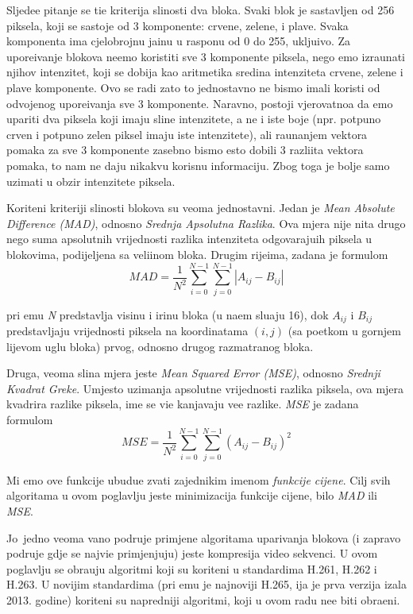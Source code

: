 Sljede\cj e pitanje se ti\ch e kriterija sli\ch nosti dva bloka. Svaki blok je sastavljen od 256 piksela, koji se sastoje od 3 komponente: crvene, zelene, i plave. Svaka komponenta ima cjelobrojnu ja\ch inu u rasponu od 0 do 255, uklju\ch ivo.
Za upore\dj ivanje blokova ne\cj emo koristiti sve 3 komponente piksela, nego \cj emo izra\ch unati njihov intenzitet, koji se dobija kao aritmeti\ch ka sredina intenziteta crvene, zelene i plave komponente. Ovo se radi zato \sh to 
jednostavno ne bismo imali koristi od odvojenog upore\dj ivanja sve 3 komponente.
Naravno, postoji vjerovatno\cj a da \cj emo upariti dva piksela koji imaju sli\ch ne intenzitete, a ne i iste boje (npr. potpuno crven i potpuno zelen piksel imaju iste intenzitete), ali ra\ch unanjem vektora pomaka za sve 3 komponente
zasebno bismo \ch esto dobili 3 razli\ch ita vektora pomaka, \sh to nam ne daju nikakvu korisnu informaciju. Zbog toga je bolje samo uzimati u obzir intenzitete piksela.

Kori\sh teni kriteriji sli\ch nosti blokova su veoma jednostavni. Jedan je  \textit{Mean Absolute Difference (MAD)}, odnosno \textit{Srednja Apsolutna Razlika}. Ova mjera nije ni\sh ta drugo nego suma apsolutnih vrijednosti razlika
intenziteta odgovaraju\cj ih piksela u blokovima, podijeljena sa veli\ch inom bloka. Drugim rije\ch ima, zadana je formulom
$$
MAD = \frac{1}{N^2}\sum_{i=0}^{N-1}\sum_{j=0}^{N-1}|A_{ij}-B_{ij}|
$$

pri \ch emu \textit{N} predstavlja visinu i \sh irinu bloka (u na\sh em slu\ch aju 16), dok $A_{ij}$ i $B_{ij}$ predstavljaju vrijednosti piksela na koordinatama $(i,j)$ (sa po\ch etkom u gornjem lijevom uglu bloka) prvog,
odnosno drugog razmatranog bloka. 

Druga, veoma sli\ch na mjera jeste \textit{Mean Squared Error (MSE)}, odnosno \textit{Srednji Kvadrat Gre\sh ke}. Umjesto uzimanja apsolutne vrijednosti razlika piksela, ova mjera kvadrira razlike piksela, \ch ime se vi\sh e
ka\zh njavaju ve\cj e razlike. \textit{MSE} je zadana formulom
$$
MSE = \frac{1}{N^2}\sum_{i=0}^{N-1}\sum_{j=0}^{N-1}(A_{ij}-B_{ij})^2
$$

Mi \cj emo ove funkcije ubudu\cj e zvati zajedni\ch kim imenom \textit{funkcije cijene}. Cilj svih algoritama u ovom poglavlju jeste minimizacija funkcije cijene, bilo \textit{MAD} ili \textit{MSE}.

Jo\sh\ jedno veoma va\zh no podru\ch je primjene algoritama uparivanja blokova (i zapravo podru\ch je gdje se najvi\sh e primjenjuju) jeste kompresija video sekvenci. U ovom poglavlju se obra\dj uju
algoritmi koji su kori\sh teni u standardima H.261, H.262 i H.263. U novijim standardima (pri \ch emu je najnoviji H.265, \ch ija je prva verzija iza\sh la 2013. godine)\cite{h265} kori\sh teni su napredniji algoritmi, koji u
ovom radu ne\cj e biti obra\dj eni.

